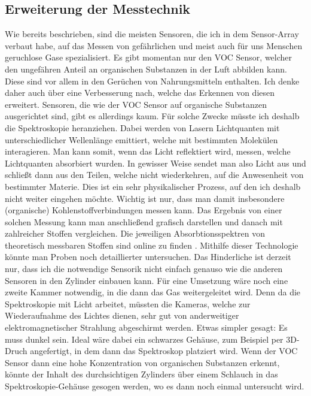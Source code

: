 \documentclass[10pt]{article}
\begin{document}
\subsection{Erweiterung der Messtechnik}
Wie bereits beschrieben, sind die meisten Sensoren, die ich in dem Sensor-Array verbaut habe, auf das Messen von gefährlichen und meist auch für uns Menschen geruchlose Gase
spezialisiert. Es gibt momentan nur den VOC Sensor, welcher den ungefähren Anteil an organischen Substanzen in der Luft abbilden kann. Diese sind vor allem in den Gerüchen von Nahrungsmitteln 
enthalten. Ich denke daher auch über eine Verbesserung nach, welche das Erkennen von diesen erweitert. Sensoren, die wie der VOC Sensor auf organische Substanzen ausgerichtet sind,
gibt es allerdings kaum. Für solche Zwecke müsste ich deshalb die Spektroskopie heranziehen. Dabei werden von
Lasern Lichtquanten mit unterschiedlicher Wellenlänge emittiert, welche mit bestimmten Molekülen interagieren. Man kann somit, wenn das Licht reflektiert wird, messen, welche Lichtquanten
absorbiert wurden. In gewisser Weise sendet man also Licht aus und schließt dann aus den Teilen, welche nicht wiederkehren, auf die Anwesenheit von bestimmter Materie. 
Dies ist ein sehr physikalischer Prozess, auf den ich deshalb nicht weiter eingehen möchte. Wichtig ist nur, dass man damit insbesondere (organische) Kohlenstoffverbindungen messen kann.
Das Ergebnis von einer solchen Messung kann man anschließend grafisch darstellen und danach mit zahlreicher Stoffen vergleichen. Die jeweiligen Absorbtionsspektren von theoretisch messbaren
Stoffen sind online zu finden \autocite{InfrarotSpektrum} \autocite{InfrarotSpektrum2} \autocite{FTIRSpektrum}.
Mithilfe dieser Technologie könnte man Proben noch detaillierter untersuchen. Das Hinderliche ist derzeit nur, dass ich die notwendige Sensorik
nicht einfach genauso wie die anderen Sensoren in den Zylinder einbauen kann. Für eine Umsetzung wäre noch eine zweite Kammer notwendig, in die dann das Gas weitergeleitet wird.
Denn da die Spektroskopie mit Licht arbeitet, müssten die Kameras, welche zur Wiederaufnahme des Lichtes dienen, sehr gut von anderweitiger elektromagnetischer Strahlung 
abgeschirmt werden. Etwas simpler gesagt: Es muss dunkel sein. Ideal wäre dabei ein schwarzes Gehäuse, zum Beispiel per 3D-Druch angefertigt, in dem dann das Spektroskop platziert wird. 
Wenn der VOC Sensor dann eine hohe Konzentration von organischen Substanzen erkennt, könnte der Inhalt des durchsichtigen Zylinders über einem Schlauch in das Spektroskopie-Gehäuse gesogen werden,
wo es dann noch einmal untersucht wird.\\
\end{document}
